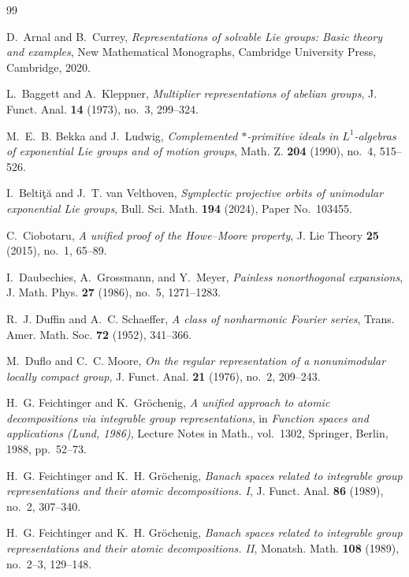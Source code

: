 \documentclass[reqno]{amsart}
\numberwithin{equation}{section}
\theoremstyle{definition}
\theoremstyle{remark}
\begin{document}
\begin{thebibliography}{99}

D.~Arnal and B.~Currey,
\emph{Representations of solvable Lie groups: Basic theory and examples},
New Mathematical Monographs, Cambridge University Press, Cambridge, 2020.

L.~Baggett and A.~Kleppner,
\emph{Multiplier representations of abelian groups},
J. Funct. Anal. \textbf{14} (1973), no.~3, 299--324.

M.~E.~B. Bekka and J.~Ludwig,
\emph{Complemented $*$-primitive ideals in $L^1$-algebras of exponential Lie
groups and of motion groups},
Math. Z. \textbf{204} (1990), no.~4, 515--526.

I.~Belti\c{t}\u{a} and J.~T. van Velthoven,
\emph{Symplectic projective orbits of unimodular exponential Lie groups},
Bull. Sci. Math. \textbf{194} (2024), Paper No.~103455.

C.~Ciobotaru,
\emph{A unified proof of the Howe--Moore property},
J. Lie Theory \textbf{25} (2015), no.~1, 65--89.

I.~Daubechies, A.~Grossmann, and Y.~Meyer,
\emph{Painless nonorthogonal expansions},
J. Math. Phys. \textbf{27} (1986), no.~5, 1271--1283.

R.~J. Duffin and A.~C. Schaeffer,
\emph{A class of nonharmonic Fourier series},
Trans. Amer. Math. Soc. \textbf{72} (1952), 341--366.

M.~Duflo and C.~C. Moore,
\emph{On the regular representation of a nonunimodular locally compact group},
J. Funct. Anal. \textbf{21} (1976), no.~2, 209--243.

H.~G. Feichtinger and K.~Gr\"ochenig,
\emph{A unified approach to atomic decompositions via integrable group
representations},
in \emph{Function spaces and applications (Lund, 1986)}, Lecture Notes in
Math., vol.~1302, Springer, Berlin, 1988, pp.~52--73.

H.~G. Feichtinger and K.~H. Gr\"ochenig,
\emph{Banach spaces related to integrable group representations and their
atomic decompositions. I},
J. Funct. Anal. \textbf{86} (1989), no.~2, 307--340.

H.~G. Feichtinger and K.~H. Gr\"ochenig,
\emph{Banach spaces related to integrable group representations and their
atomic decompositions. II},
Monatsh. Math. \textbf{108} (1989), no.~2--3, 129--148.


\end{thebibliography}
\end{document}
